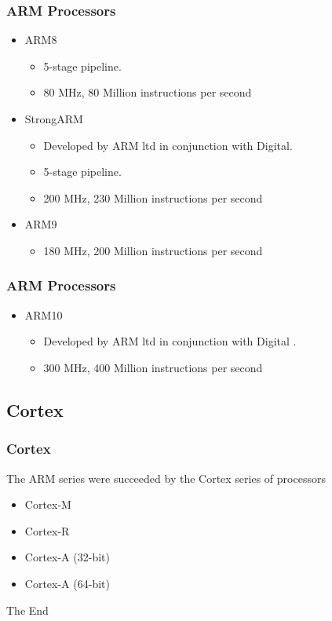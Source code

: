 \documentclass{beamer}
\begin{document}

\begin{frame}
\frametitle{ARM Processors}

\begin{itemize}

\item ARM8
\begin{itemize}
\item 5-stage pipeline.
\item 80 MHz, 80 Million instructions per second
\end{itemize}

\item StrongARM
\begin{itemize}
\item Developed by ARM ltd in conjunction with Digital.
\item 5-stage pipeline.
\item 200 MHz, 230 Million instructions per second
\end{itemize}

\item ARM9
\begin{itemize}
\item 180 MHz, 200 Million instructions per second
\end{itemize}

\end{itemize}
\end{frame}

\begin{frame}
\frametitle{ARM Processors}

\begin{itemize}


\item ARM10
\begin{itemize}
\item Developed by ARM ltd in conjunction with Digital .
\item 300 MHz, 400 Million instructions per second
\end{itemize}
\end{itemize}
\end{frame}

\subsection{Cortex}
\begin{frame}
\frametitle{Cortex}


The ARM series were succeeded by the Cortex series of processors
\begin{itemize}

\item Cortex-M
\item Cortex-R
\item Cortex-A (32-bit)
\item Cortex-A (64-bit)

\end{itemize}
\end{frame}




\begin{frame}
\Huge{\centerline{The End}}
\end{frame}

\end{document}
